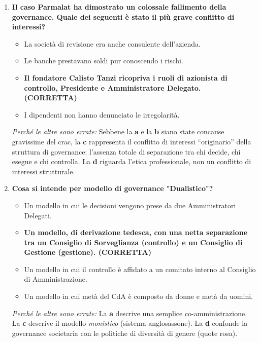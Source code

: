 \documentclass[a4paper,12pt]{article}
\begin{document}
	\begin{enumerate}[start=6]
		
		\item \textbf{Il caso Parmalat ha dimostrato un colossale fallimento della governance. Quale dei seguenti è stato il più grave conflitto di interessi?}
		\begin{itemize}
			\item[a)] La società di revisione era anche consulente dell'azienda.
			\item[b)] Le banche prestavano soldi pur conoscendo i rischi.
			\item[c)] \textbf{Il fondatore Calisto Tanzi ricopriva i ruoli di azionista di controllo, Presidente e Amministratore Delegato. (CORRETTA)}
			\item[d)] I dipendenti non hanno denunciato le irregolarità.
		\end{itemize}
		\textit{Perché le altre sono errate:} Sebbene la \textbf{a} e la \textbf{b} siano state concause gravissime del crac, la \textbf{c} rappresenta il conflitto di interessi ``originario'' della struttura di governance: l'assenza totale di separazione tra chi decide, chi esegue e chi controlla. La \textbf{d} riguarda l'etica professionale, non un conflitto di interessi strutturale.
		
		\item \textbf{Cosa si intende per modello di governance "Dualistico"?}
		\begin{itemize}
			\item[a)] Un modello in cui le decisioni vengono prese da due Amministratori Delegati.
			\item[b)] \textbf{Un modello, di derivazione tedesca, con una netta separazione tra un Consiglio di Sorveglianza (controllo) e un Consiglio di Gestione (gestione). (CORRETTA)}
			\item[c)] Un modello in cui il controllo è affidato a un comitato interno al Consiglio di Amministrazione.
			\item[d)] Un modello in cui metà del CdA è composto da donne e metà da uomini.
		\end{itemize}
		\textit{Perché le altre sono errate:} La \textbf{a} descrive una semplice co-amministrazione. La \textbf{c} descrive il modello \textit{monistico} (sistema anglosassone). La \textbf{d} confonde la governance societaria con le politiche di diversità di genere (quote rosa).
		

\end{enumerate}
\end{document}

